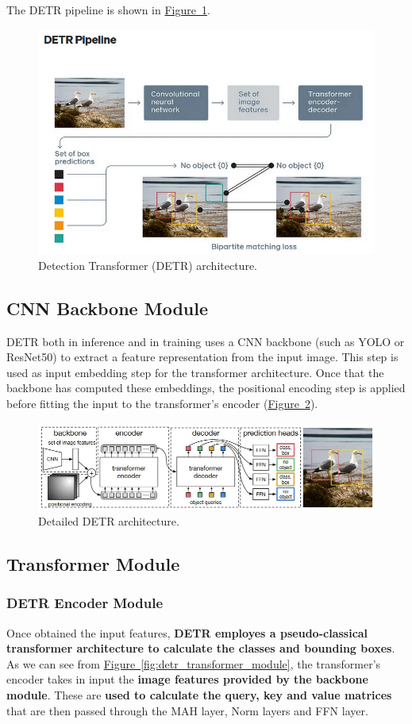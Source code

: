 \documentclass[12pt]{article}
\begin{document}
The DETR pipeline is shown in \hyperref[fig:detr_architecture]{Figure~\ref*{fig:detr_architecture}}.

\begin{figure}
    \centering
    \includegraphics[width=.7\textwidth]{Images/detr_architecture.png}
    \caption{Detection Transformer (DETR) architecture.}
    \label{fig:detr_architecture}
\end{figure}

\subsection{CNN Backbone Module}
DETR both in inference and in training uses a CNN backbone (such as YOLO or ResNet50) to extract a feature representation 
from the input image. This step is used as input embedding step for the transformer architecture. 
Once that the backbone has computed these embeddings, the positional encoding step is applied before fitting
the input to the transformer's encoder (\hyperref[fig:detr_architecture_2]{Figure~\ref*{fig:detr_architecture_2}}).

\begin{figure}
    \centering
    \includegraphics[width=.7\textwidth]{Images/detr_architecture_2.png}
    \caption{Detailed DETR architecture.}
    \label{fig:detr_architecture_2}
\end{figure}

\subsection{Transformer Module}

\subsubsection{DETR Encoder Module}
Once obtained the input features, \textbf{DETR employes a pseudo-classical transformer architecture to calculate the classes and 
bounding boxes}. As we can see from \hyperref[fig:detr_transformer_module]{Figure~\ref*{fig:detr_transformer_module}},
the transformer's encoder takes in input the \textbf{image features provided by the backbone module}. These 
are \textbf{used to calculate the query, key and value matrices} that are then passed through the MAH layer, 
Norm layers and FFN layer. 
\end{document}

